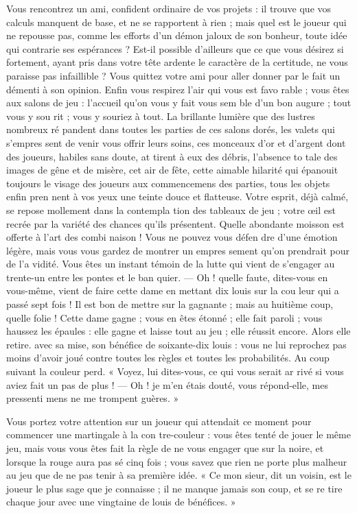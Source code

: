 Vous rencontrez un ami, confident
ordinaire de vos projets : il trouve que
vos calculs manquent de base, et ne
se rapportent à rien ; mais quel est le
joueur qui ne repousse pas, comme
les efforts d'un démon jaloux de son
bonheur, toute idée qui contrarie ses
espérances ? Est-il possible d'ailleurs
que ce que vous désirez si fortement,
ayant pris dans votre tête ardente le
caractère de la certitude, ne vous
paraisse pas infaillible ? Vous quittez
votre ami pour aller donner par le
fait un démenti à son opinion. Enfin
vous respirez l'air qui vous est favo%
rable ; vous êtes aux salons de jeu :
l'accueil qu'on vous y fait vous sem%
ble d'un bon augure ; tout vous y sou%
rit ; vous y souriez à tout. La brillante
lumière que des lustres nombreux ré%
pandent dans toutes les parties de ces
salons dorés, les valets qui s'empres%
sent de venir vous offrir leurs soins,
ces monceaux d'or et d'argent dont
des joueurs, habiles sans doute, at%
tirent à eux des débris, l'absence to%
tale des images de gêne et de misère,
cet air de fête, cette aimable hilarité
qui épanouit toujours le visage des
joueurs aux commencemens des
parties, tous les objets enfin pren%
nent à vos yeux une teinte douce et
flatteuse. Votre esprit, déjà calmé, se
repose mollement dans la contempla%
tion des tableaux de jeu ; votre œil
est recrée par la variété des chances
qu'ils présentent. Quelle abondante
moisson est offerte à l'art des combi%
naison ! Vous ne pouvez vous défen%
dre d'une émotion légère, mais vous
vous gardez de montrer un empres%
sement qu'on prendrait pour de l'a%
vidité. Vous êtes un instant témoin
de la lutte qui vient de s'engager au
trente-un entre les pontes et le ban%
quier. --- Oh ! quelle faute, dites-vous
en vous-même, vient de faire cette
dame en mettant dix louis sur la cou%
leur qui a passé sept fois ! Il est bon
de mettre sur la gagnante ; mais au
huitième coup, quelle folie ! Cette
dame gagne ; vous en êtes étonné ; elle
fait paroli ; vous haussez les épaules :
elle gagne et laisse tout au jeu ; elle
réussit encore. Alors elle retire. avec
sa mise, son bénéfice de soixante-dix
louis : vous ne lui reprochez pas moins
d'avoir joué contre toutes les règles
et toutes les probabilités. Au coup
suivant la couleur perd. « Voyez, lui
dites-vous, ce qui vous serait ar%
rivé si vous aviez fait un pas de
plus ! --- Oh ! je m'en étais douté,
vous répond-elle, mes pressenti%
mens ne me trompent guères. »

Vous portez votre attention sur un
joueur qui attendait ce moment pour
commencer une martingale à la con%
tre-couleur : vous êtes tenté de jouer
le même jeu, mais vous vous êtes fait
la règle de ne vous engager que sur
la noire, et lorsque la rouge aura pas%
sé cinq fois ; vous savez que rien ne
porte plus malheur au jeu que de ne
pas tenir à sa première idée. « Ce mon%
sieur, dit un voisin, est le joueur
le plus sage que je connaisse ; il ne
manque jamais son coup, et se re%
tire chaque jour avec une vingtaine
de louis de bénéfices. »

